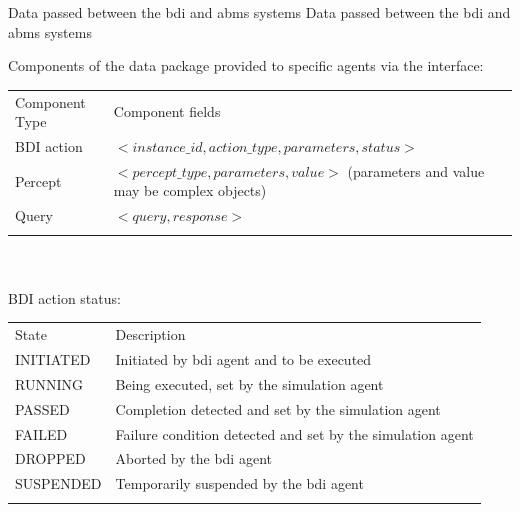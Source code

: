
\createtable%
{Data passed between the \gls{bdi} and \gls{abms} systems}%
{Data passed between the \gls{bdi} and \gls{abms} systems}%
{\label{interfacedata}}%
{%
Components of the data package provided to specific agents via the interface:\\ 
  \begin{tabular}{ @{}p{} | p{}@{}}
\hline\noalign{\smallskip}
{Component Type} & {Component fields}\\
\noalign{\smallskip}\hline\noalign{\smallskip}
{BDI action} & $<instance\_id, action\_type, parameters, status>$  \\
{Percept} & $<percept\_type, parameters, value>$
(parameters and value may be complex objects) \\
{Query} & $<query, response>$ \\
\noalign{\smallskip}\hline
\end{tabular}

~\\~\\BDI action status:\\
\begin{tabular}{ @{}p{} | p{}@{}}
\hline\noalign{\smallskip}
{State} & {Description}\\
\noalign{\smallskip}\hline\noalign{\smallskip}
INITIATED & Initiated by \gls{bdi} agent and to be executed\\
RUNNING & Being executed, set by the simulation agent\\
PASSED & Completion detected and set by the simulation agent \\
FAILED & Failure condition detected and set by the simulation agent \\
DROPPED & Aborted by the \gls{bdi} agent \\
SUSPENDED & Temporarily suspended by the \gls{bdi} agent  \\
\noalign{\smallskip}\hline
\end{tabular}
}%
{}

